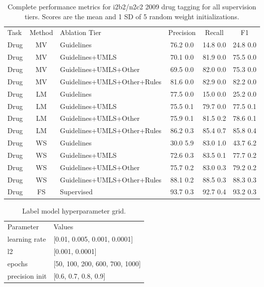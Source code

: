 \documentclass{article}
\begin{document}
\begin{table}[H]
\centering
\begin{tabular}{lclccc} \toprule
Task & Method & Ablation Tier & Precision & Recall & F1 \\
\cmidrule(lr){1-6}
Drug   &   MV   &   Guidelines   &   76.2 0.0   &   14.8 0.0   &   24.8 0.0  \\
Drug   &   MV   &   Guidelines+UMLS   &   70.1 0.0   &   81.9 0.0   &   75.5 0.0  \\
Drug   &   MV   &   Guidelines+UMLS+Other   &   69.5 0.0   &   82.0 0.0   &   75.3 0.0  \\
Drug   &   MV   &   Guidelines+UMLS+Other+Rules   &   81.6 0.0   &   82.9 0.0   &   82.2 0.0  \\
\cmidrule(lr){1-6}
Drug   &   LM   &   Guidelines   &   77.5 0.0   &   15.0 0.0   &   25.2 0.0  \\
Drug   &   LM   &   Guidelines+UMLS   &   75.5 0.1   &   79.7 0.0   &   77.5 0.1  \\
Drug   &   LM   &   Guidelines+UMLS+Other   &   75.9 0.1   &   81.5 0.2   &   78.6 0.1  \\
Drug   &   LM   &   Guidelines+UMLS+Other+Rules   &   86.2 0.3   &   85.4 0.7   &   85.8 0.4  \\
\cmidrule(lr){1-6}
Drug   &   WS   &   Guidelines   &   30.0 5.9   &   83.0 1.0   &   43.7 6.2  \\
Drug   &   WS   &   Guidelines+UMLS   &   72.6 0.3   &   83.5 0.1   &   77.7 0.2  \\
Drug   &   WS   &   Guidelines+UMLS+Other   &   75.7 0.2   &   83.0 0.3   &   79.2 0.2  \\
Drug   &   WS   &   Guidelines+UMLS+Other+Rules   &   88.1 0.2   &   88.5 0.3   &   88.3 0.3  \\
\cmidrule(lr){1-6}
Drug   &   FS   &   Supervised   &   93.7 0.3   &   92.7 0.4   &   93.2 0.3  \\
\bottomrule  
\end{tabular}
\caption{ \label{tbl:diseases} Complete performance metrics for i2b2/n2c2 2009 drug tagging for all supervision tiers.
Scores are the mean and 1 SD of 5 random weight initializations.}
\end{table}


\begin{table}[H]
\centering
\begin{tabular}{ll} \toprule
Parameter        & Values \\
\cmidrule(lr){1-2}
learning rate    & [0.01, 0.005, 0.001, 0.0001] \\
l2               & [0.001, 0.0001] \\
epochs           & [50, 100, 200, 600, 700, 1000] \\
precision init   & [0.6, 0.7, 0.8, 0.9] \\
\bottomrule  
\end{tabular}
\caption{\label{tbl:lmgrid} Label model hyperparameter grid.}
\end{table}
\end{document}
